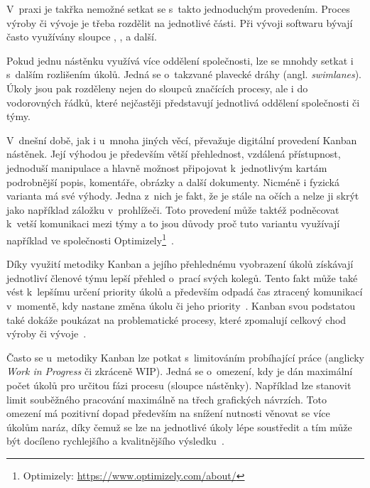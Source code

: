 V~praxi je takřka nemožné setkat se s~takto jednoduchým provedením. Proces výroby či vývoje je třeba rozdělit na jednotlivé části. Při vývoji softwaru bývají často využívány sloupce , ,  a další.  

Pokud jednu nástěnku využívá více oddělení společnosti, lze se mnohdy setkat i s~dalším rozlišením úkolů. Jedná se o~takzvané plavecké dráhy (angl. \emph{swimlanes}). Úkoly jsou pak rozděleny nejen do sloupců značících procesy, ale i do vodorovných řádků, které nejčastěji představují jednotlivá oddělení společnosti či týmy. 

V~dnešní době, jak i u~mnoha jiných věcí, převažuje digitální provedení Kanban nástěnek. Její výhodou je především větší přehlednost, vzdálená přístupnost, jednoduší manipulace a hlavně možnost připojovat k~jednotlivým kartám podrobnější popis, komentáře, obrázky a další dokumenty. Nicméně i fyzická varianta má své výhody. Jedna z~nich je fakt, že je stále na očích a nelze ji skrýt jako například záložku v~prohlížeči. Toto provedení může taktéž podněcovat k~vetší komunikaci mezi týmy a to jsou důvody proč tuto variantu využívají například ve společnosti Optimizely\footnote{Optimizely: \url{https://www.optimizely.com/about/}}~\cite{bib:kanban-atlassian}.

Díky využití metodiky Kanban a jejího přehlednému vyobrazení úkolů získávají jednotliví členové týmu lepší přehled o~prací svých kolegů. Tento fakt může také vést k~lepšímu určení priority úkolů a především odpadá čas ztracený komunikací v~momentě, kdy nastane změna úkolu či jeho priority~\cite{bib:kanban-101}.
Kanban svou podstatou také dokáže poukázat na problematické procesy, které zpomalují celkový chod výroby či vývoje~\cite{bib:kanban-and-scrum}.

Často se u~metodiky Kanban lze potkat s~limitováním probíhající práce (anglicky \emph{Work in Progress} či zkráceně WIP). Jedná se o~omezení, kdy je dán maximální počet úkolů pro určitou fázi procesu (sloupce nástěnky). Například lze stanovit limit souběžného pracování maximálně na třech grafických návrzích. Toto omezení má pozitivní dopad především na snížení nutnosti věnovat se více úkolům naráz, díky čemuž se lze na jednotlivé úkoly lépe soustředit a tím může být docíleno rychlejšího a kvalitnějšího výsledku~\cite{bib:kanban-101}.

